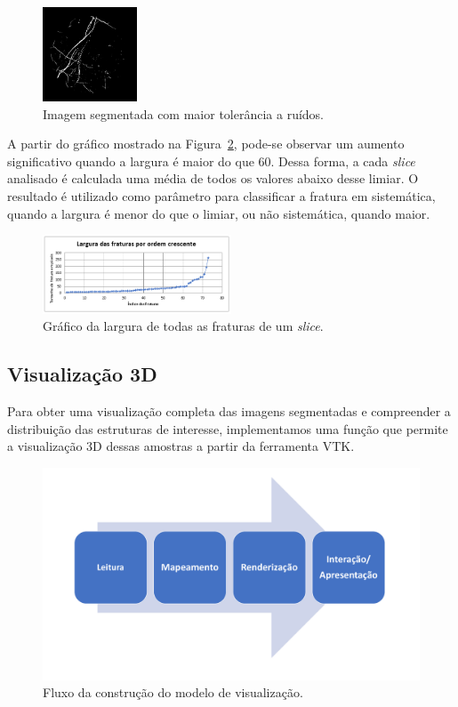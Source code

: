 \documentclass[a4paper,10pt,twocolumn,twoside]{article}
\begin{document}
\begin{itemize}
\begin{figure}[!htb]
\centering
\includegraphics[width=0.25\textwidth]{Figuras/seg_ruidos.png}
\caption{Imagem segmentada com maior tolerância a ruídos.}
\label{fig:ruidos}
\end{figure}

A partir do gráfico mostrado na Figura~\ref{fig:grafico}, pode-se observar um aumento significativo quando a largura é maior do que 60. Dessa forma, a cada \textit{slice} analisado é calculada uma média de todos os valores abaixo desse limiar. O resultado é utilizado como parâmetro para classificar a fratura em sistemática, quando a largura é menor do que o limiar, ou não sistemática, quando maior.

\begin{figure}[!htb]
\centering
\includegraphics[width=0.5\textwidth]{Figuras/grafico_tamanho.png}
\caption{Gráfico da largura de todas as fraturas de um \textit{slice}.}
\label{fig:grafico}
\end{figure}

\end{itemize}

\subsection{Visualização 3D}

Para obter uma visualização completa das imagens segmentadas e compreender a distribuição das estruturas de interesse, implementamos uma função que permite a visualização 3D dessas amostras a partir da ferramenta VTK.

\begin{figure}[!htb]
\centering
\includegraphics[width=.5\textwidth]{Figuras/fases_vtk.pdf} \hspace*{0.1cm}
\caption{Fluxo da construção do modelo de visualização.}
\label{fig:fluxo_vtk}
\end{figure}
\end{document}
